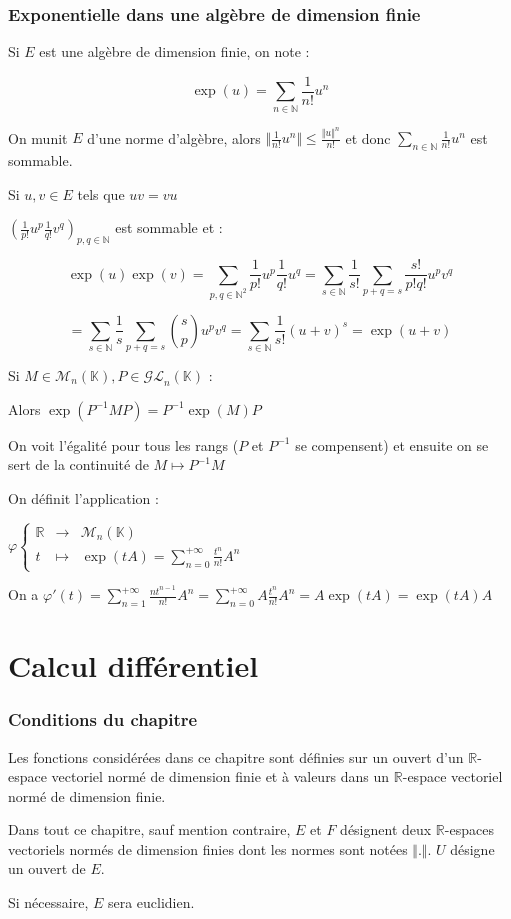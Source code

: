 \documentclass[a4paper,12pt]{book}
\newcommand{\Def}[2]{\begin{tcolorbox}[sharp corners, colback=white,colframe=blue!90!black!75, title=Définition : #1]#2\end{tcolorbox}}
\newcommand{\Prop}[2]{\begin{tcolorbox}[sharp corners, colback=white,colframe=red!90!black!75, title=Proposition : #1]#2\end{tcolorbox}}
\newcommand{\Pre}[1]{\begin{tcolorbox}[sharp corners, colback=white,colframe=green!60!green!30!black!75, title=Preuve]#1\end{tcolorbox}}
\def\R{\mathbb{R}}
\def\N{\mathbb{N}}
\def\K{\mathbb{K}}
\begin{document}
\subsection{Exponentielle dans une algèbre de dimension finie}
\Def{Exponentielle}{Si $E$ est une algèbre de dimension finie, on note :
\par $$\exp(u) = \sum\limits_{n\in\N}\frac{1}{n!}u^n$$
\par On munit $E$ d'une norme d'algèbre, alors $\Vert\frac{1}{n!}u^n\Vert \leq \frac{\Vert u\Vert^n}{n!}$ et donc $\sum\limits_{n\in\N}\frac{1}{n!}u^n$ est sommable.}
\Prop{Morphisme d'algèbre}{Si $u,v\in E$ tels que $uv = vu$
\par $\left(\frac{1}{p!}u^p\frac{1}{q!}v^q\right)_{p,q\in\N}$ est sommable et :
\par $$\exp(u)\exp(v) = \sum\limits_{p,q\in\N^2} \frac{1}{p!}u^p\frac{1}{q!}u^q = \sum\limits_{s\in\N}\frac{1}{s!}\sum\limits_{p+q=s}\frac{s!}{p!q!}u^pv^q$$
\par $$=\sum\limits_{s\in\N}\frac{1}{s}\sum\limits_{p+q=s}\binom{s}{p}u^pv^q = \sum\limits_{s\in\N}\frac{1}{s!}(u+v)^s = \exp(u+v)$$}
\Prop{Changement de base}{Si $M\in\mathcal{M}_n(\K), P\in\mathcal{GL}_n(\K)$ :
\par Alors $\exp(P^{-1}MP)=P^{-1}\exp(M)P$ }
\Pre{On voit l'égalité pour tous les rangs ($P$ et $P^{-1}$ se compensent) et ensuite on se sert de la continuité de $M\mapsto P^{-1}M$}
\Def{Série entière à coefficient matriciel}{On définit l'application :
\par $\varphi\left\{\begin{array}{rcl}\R & \to & \mathcal{M}_n(\K) \\ t & \mapsto & \exp(tA)=\sum\limits_{n=0}^{+\infty}\frac{t^n}{n!}A^n\end{array}\right.$
\par On a $\varphi'(t) = \sum\limits_{n=1}^{+\infty}\frac{nt^{n-1}}{n!}A^n = \sum\limits_{n=0}^{+\infty}A\frac{t^n}{n!}A^n = A\exp(tA) = \exp(tA)A$}




\chapter{Calcul différentiel}\subsection{Conditions du chapitre}
Les fonctions considérées dans ce chapitre sont définies sur un ouvert d'un $\R$-espace vectoriel normé de dimension finie et à valeurs dans un  $\R$-espace vectoriel normé de dimension finie.
\par Dans tout ce chapitre, sauf mention contraire, $E$ et $F$ désignent deux $\R$-espaces vectoriels normés de dimension finies dont les normes sont notées $\Vert.\Vert$. $U$ désigne un ouvert de $E$.
\par Si nécessaire, $E$ sera euclidien.
\end{document}
